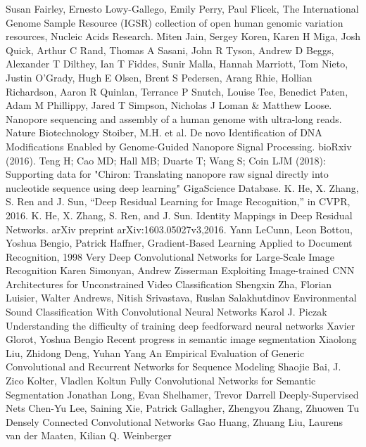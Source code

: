 \documentclass[a4paper,11pt,twoside]{report}
\theoremstyle{definition}
\begin{document}
\begin{thebibliography}{20}
 Susan Fairley, Ernesto Lowy-Gallego, Emily Perry, Paul Flicek, The International Genome Sample Resource (IGSR) collection of open human genomic variation resources, Nucleic Acids Research.
 Miten Jain, Sergey Koren, Karen H Miga, Josh Quick, Arthur C Rand, Thomas A Sasani, John R Tyson, Andrew D Beggs, Alexander T Dilthey, Ian T Fiddes, Sunir Malla, Hannah Marriott, Tom Nieto, Justin O'Grady, Hugh E Olsen, Brent S Pedersen, Arang Rhie, Hollian Richardson, Aaron R Quinlan, Terrance P Snutch, Louise Tee, Benedict Paten, Adam M Phillippy, Jared T Simpson, Nicholas J Loman \& Matthew Loose. Nanopore sequencing and assembly of a human genome with ultra-long reads. Nature Biotechnology
Stoiber, M.H. et al. De novo Identification of DNA Modifications Enabled by Genome-Guided Nanopore Signal Processing. bioRxiv (2016).
 Teng H; Cao MD; Hall MB; Duarte T; Wang S; Coin LJM (2018): Supporting data for "Chiron: Translating nanopore raw signal directly into nucleotide sequence using deep learning" GigaScience Database.
 K. He, X. Zhang, S. Ren and J. Sun, “Deep Residual Learning for Image Recognition,” in CVPR, 2016.
K. He, X. Zhang, S. Ren, and J. Sun. Identity Mappings in Deep Residual Networks. arXiv preprint arXiv:1603.05027v3,2016.
Yann LeCunn, Leon Bottou, Yoshua Bengio, Patrick Haffner, Gradient-Based Learning Applied to Document Recognition, 1998
Very Deep Convolutional Networks for Large-Scale Image Recognition Karen Simonyan, Andrew Zisserman
 Exploiting Image-trained CNN Architectures for Unconstrained Video Classification Shengxin Zha, Florian Luisier, Walter Andrews, Nitish Srivastava, Ruslan Salakhutdinov
 Environmental Sound Classification With Convolutional Neural Networks Karol J. Piczak
Understanding the difficulty of training deep feedforward neural networks Xavier Glorot, Yoshua Bengio
 Recent progress in semantic image segmentation Xiaolong Liu, Zhidong Deng, Yuhan Yang
 An Empirical Evaluation of Generic Convolutional and Recurrent Networks for Sequence Modeling Shaojie Bai, J. Zico Kolter, Vladlen Koltun
Fully Convolutional Networks for Semantic Segmentation Jonathan Long, Evan Shelhamer, Trevor Darrell
Deeply-Supervised Nets Chen-Yu Lee, Saining Xie, Patrick Gallagher, Zhengyou Zhang, Zhuowen Tu
Densely Connected Convolutional Networks Gao Huang, Zhuang Liu, Laurens van der Maaten, Kilian Q. Weinberger

\end{thebibliography}
\end{document}

